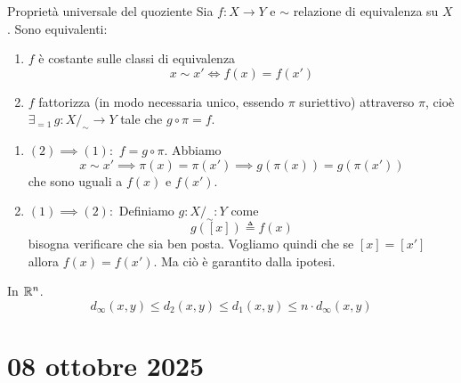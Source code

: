 \documentclass[a4paper]{article}
\begin{document}
\begin{snippetproposition}{Proprietà universale del quoziente}
    Sia \(f\colon X \to Y\) e \(\sim\) relazione di equivalenza su \(X\). Sono equivalenti:
    \begin{enumerate}
        \item \(f\) è costante sulle classi di equivalenza
            \[ x \sim x' \iff f(x) = f(x') \]
        \item \(f\) fattorizza (in modo necessaria unico, essendo \(\pi\) suriettivo) attraverso
            \(\pi\), cioè \(\exists_{=1} \,g \colon X/_\sim \to Y\) tale che \(g \circ \pi = f\).
    \end{enumerate}
\end{snippetproposition}
\begin{center}
\end{center}

\begin{snippetproof}{}
    \begin{enumerate}
        \item \((2) \implies (1):\) \(f = g \circ \pi\).
        Abbiamo \[
            x \sim x' \implies
            \pi(x) = \pi(x') \implies g(\pi(x)) = g(\pi(x'))
        \]
        che sono uguali a \(f(x)\) e \(f(x')\).
        \item \((1) \implies (2):\)
        Definiamo \(g\colon X/_\sim \colon Y\) come
        \[
            g([x]) \triangleq f(x)
        \]
        bisogna verificare che sia ben posta.
        Vogliamo quindi che se \([x] = [x']\) allora \(f(x) = f(x')\).
        Ma ciò è garantito dalla ipotesi.
    \end{enumerate}
\end{snippetproof}

In \(\mathbb{R}^n\).
\[
    d_\infty(x,y) \leq d_2(x,y) \leq d_1(x,y) \leq n \cdot d_\infty(x,y)
\]

\section{08 ottobre 2025}
\end{document}
